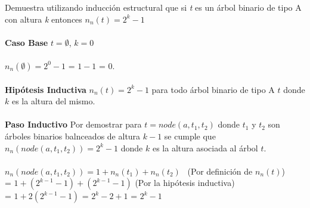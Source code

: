     \bigskip
    
    \begin{exercise}
        Demuestra utilizando inducción estructural que si \textit{t} es un árbol binario de tipo A con altura \textit{k} entonces $n_n(t) = 2^k - 1$ \\\\
        \textbf{Caso Base} $t = \emptyset$, $k=0$\\\\
            $n_n(\emptyset) = 2^0 -1 $ = $1 -1$ = 0.\\\\
        \textbf{Hipótesis Inductiva} $n_n(t) = 2^k - 1$ para todo árbol binario de tipo A $t$ donde $k$ es la altura del mismo. \\\\
        \textbf{Paso Inductivo} Por demostrar para $t = node(a,t_1,t_2)$ donde $t_1$ y $t_2$ son árboles binarios balnceados de altura $k-1$ se cumple que $n_n(node(a,t_1,t_2)) = 2^k - 1$ donde $k$ es la altura asociada al árbol $t$. \\\\
            $n_n(node(a,t_1,t_2)) = 1 + n_n(t_1) + n_n(t_2)$ \quad \quad \quad \quad \quad \quad \quad\ (Por definición de $n_n(t)$) \\
            = $1 + (2^{k-1} - 1) + (2^{k-1} - 1)$ \qquad \qquad \qquad \qquad \qquad \qquad  (Por la hipótesis inductiva) \\
            = $1 + 2(2^{k-1} - 1)$ = $2^k - 2 + 1$ = $2^k - 1$
    \end{exercise}

    \bigskip

